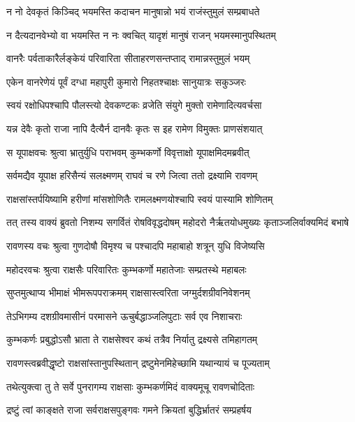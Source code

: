 \twolineshloka
{न नो देवकृतं किञ्चिद् भयमस्ति कदाचन}
{मानुषान्नो भयं राजंस्तुमुलं सम्प्रबाधते} %

\twolineshloka
{न दैत्यदानवेभ्यो वा भयमस्ति न नः क्वचित्}
{यादृशं मानुषं राजन् भयमस्मानुपस्थितम्} %

\twolineshloka
{वानरैः पर्वताकारैर्लङ्केयं परिवारिता}
{सीताहरणसन्तप्ताद् रामान्नस्तुमुलं भयम्} %

\twolineshloka
{एकेन वानरेणेयं पूर्वं दग्धा महापुरी}
{कुमारो निहतश्चाक्षः सानुयात्रः सकुञ्जरः} %

\twolineshloka
{स्वयं रक्षोधिपश्चापि पौलस्त्यो देवकण्टकः}
{व्रजेति संयुगे मुक्तो रामेणादित्यवर्चसा} %

\twolineshloka
{यन्न देवैः कृतो राजा नापि दैत्यैर्न दानवैः}
{कृतः स इह रामेण विमुक्तः प्राणसंशयात्} %

\twolineshloka
{स यूपाक्षवचः श्रुत्वा भ्रातुर्युधि पराभवम्}
{कुम्भकर्णो विवृत्ताक्षो यूपाक्षमिदमब्रवीत्} %

\twolineshloka
{सर्वमद्यैव यूपाक्ष हरिसैन्यं सलक्ष्मणम्}
{राघवं च रणे जित्वा ततो द्रक्ष्यामि रावणम्} %

\twolineshloka
{राक्षसांस्तर्पयिष्यामि हरीणां मांसशोणितैः}
{रामलक्ष्मणयोश्चापि स्वयं पास्यामि शोणितम्} %

\twolineshloka
{तत् तस्य वाक्यं ब्रुवतो निशम्य सगर्वितं रोषविवृद्धदोषम्}
{महोदरो नैर्ऋतयोधमुख्यः कृताञ्जलिर्वाक्यमिदं बभाषे} %

\twolineshloka
{रावणस्य वचः श्रुत्वा गुणदोषौ विमृश्य च}
{पश्चादपि महाबाहो शत्रून् युधि विजेष्यसि} %

\twolineshloka
{महोदरवचः श्रुत्वा राक्षसैः परिवारितः}
{कुम्भकर्णो महातेजाः सम्प्रतस्थे महाबलः} %

\twolineshloka
{सुप्तमुत्थाप्य भीमाक्षं भीमरूपपराक्रमम्}
{राक्षसास्त्वरिता जग्मुर्दशग्रीवनिवेशनम्} %

\twolineshloka
{तेऽभिगम्य दशग्रीवमासीनं परमासने}
{ऊचुर्बद्धाञ्जलिपुटाः सर्व एव निशाचराः} %

\twolineshloka
{कुम्भकर्णः प्रबुद्धोऽसौ भ्राता ते राक्षसेश्वर}
{कथं तत्रैव निर्यातु द्रक्ष्यसे तमिहागतम्} %

\twolineshloka
{रावणस्त्वब्रवीद्धृष्टो राक्षसांस्तानुपस्थितान्}
{द्रष्टुमेनमिहेच्छामि यथान्यायं च पूज्यताम्} %

\twolineshloka
{तथेत्युक्त्वा तु ते सर्वे पुनरागम्य राक्षसाः}
{कुम्भकर्णमिदं वाक्यमूचू रावणचोदिताः} %

\twolineshloka
{द्रष्टुं त्वां काङ्क्षते राजा सर्वराक्षसपुङ्गवः}
{गमने क्रियतां बुद्धिर्भ्रातरं सम्प्रहर्षय} %

